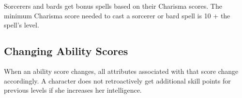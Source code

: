Sorcerers and bards get bonus spells based on their Charisma scores. The minimum Charisma score needed to cast a sorcerer or bard spell is 10 + the spell's level.

\subsection{Changing Ability Scores}
When an ability score changes, all attributes associated with that score change accordingly. A character does not retroactively get additional skill points for previous levels if she increases her intelligence.
